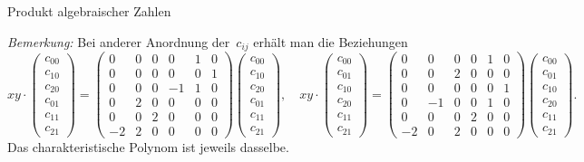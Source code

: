 \documentclass{algblatt}
\begin{document}
\begin{aufgabe}{Produkt algebraischer Zahlen}
\begin{loesungE}
\begin{scriptsize}\emph{Bemerkung:} Bei anderer Anordnung der~$c_{ij}$ erhält
man die Beziehungen
\[
  xy \cdot
  \begin{pmatrix}c_{00}\\c_{10}\\c_{20}\\c_{01}\\c_{11}\\c_{21}\end{pmatrix} =
  \begin{pmatrix}
    0&0&0&0&1&0 \\
    0&0&0&0&0&1 \\
    0&0&0&-1&1&0 \\
    0&2&0&0&0&0 \\
    0&0&2&0&0&0 \\
    -2&2&0&0&0&0
  \end{pmatrix}
  \begin{pmatrix}c_{00}\\c_{10}\\c_{20}\\c_{01}\\c_{11}\\c_{21}\end{pmatrix}\!,
  \quad
  xy \cdot
  \begin{pmatrix}c_{00}\\c_{01}\\c_{10}\\c_{20}\\c_{11}\\c_{21}\end{pmatrix} =
  \begin{pmatrix}
    0&0&0&0&1&0 \\
    0&0&2&0&0&0 \\
    0&0&0&0&0&1 \\
    0&-1&0&0&1&0 \\
    0&0&0&2&0&0 \\
    -2&0&2&0&0&0
  \end{pmatrix}
  \begin{pmatrix}c_{00}\\c_{01}\\c_{10}\\c_{20}\\c_{11}\\c_{21}\end{pmatrix}\!.
\]
Das charakteristische Polynom ist jeweils dasselbe.\end{scriptsize}


\end{loesungE}
\end{aufgabe}
\end{document}
